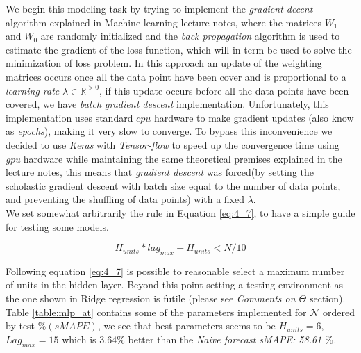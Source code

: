 We begin this modeling task by trying to implement the \emph{gradient-decent} algorithm explained in Machine learning lecture notes, where the matrices $W_{1}$  and $W_{0}$ are randomly initialized and the \emph{back propagation} algorithm is used to estimate the gradient of the loss function, which will in term be used to solve the minimization of loss problem. In this approach an update of the weighting matrices occurs once all the data point have been cover and is proportional to a \emph{learning rate} $\lambda \in \mathbb{R}^{>0}$, if this update occurs before all the data points have been covered, we have \emph{batch gradient descent} implementation. Unfortunately, this implementation uses standard $cpu$ hardware to make gradient updates (also know as \emph{epochs}), making it very slow to converge. To bypass this inconvenience we decided to use \emph{Keras} with \emph{Tensor-flow}\cite{chollet2015keras} to speed up the convergence time using \emph{gpu} hardware while maintaining the same theoretical premises explained in the lecture notes, this means that \emph{gradient descent} was forced(by setting the scholastic gradient descent with batch size equal to the number of data points, and preventing the shuffling of data points) with a fixed  $\lambda$.\\

We set somewhat arbitrarily the rule in Equation \ref{eq:4_7}, to have a simple guide for testing some models.


\begin{equation}
H_{units}*lag_{max}+H_{units}<N/10
\label{eq:4_7}
\end{equation}

Following equation \ref{eq:4_7} is possible to reasonable select a maximum number of units in the hidden layer. Beyond this point setting a testing environment as the one shown in Ridge regression is futile (please see \textit{Comments on $\Theta$} section). Table \ref{table:mlp_at} contains some of the parameters implemented  for $\mathcal{N}$ ordered by test $\%(sMAPE)$, we see that best parameters seems to be $H_{units}=6$, $Lag_{max}=15$ which is $3.64\%$  better than the \textit{Naive forecast sMAPE: 58.61 $\%$.}\\


